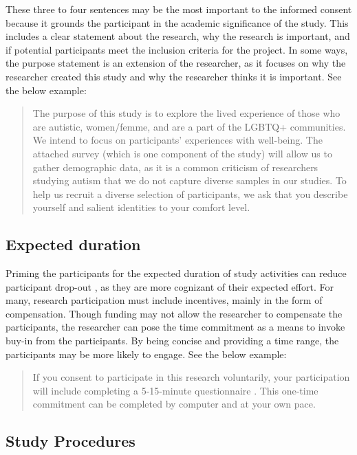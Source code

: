 \documentclass[
  11pt,
]{book}
\begin{document}
These three to four sentences may be the most important to the informed consent because it grounds the participant in the academic significance of the study. This includes a clear statement about the research, why the research is important, and if potential participants meet the inclusion criteria for the project. In some ways, the purpose statement is an extension of the researcher, as it focuses on why the researcher created this study and why the researcher thinks it is important. See the below example:

\begin{quote}
The purpose of this study is to explore the lived experience of those who are autistic, women/femme, and are a part of the LGBTQ+ communities. We intend to focus on participants' experiences with well-being. The attached survey (which is one component of the study) will allow us to gather demographic data, as it is a common criticism of researchers studying autism that we do not capture diverse samples in our studies. To help us recruit a diverse selection of participants, we ask that you describe yourself and salient identities to your comfort level.
\end{quote}

\subsection{Expected duration}\label{expected-duration}

Priming the participants for the expected duration of study activities can reduce participant drop-out \citep{oneil_web-based_2003}, as they are more cognizant of their expected effort. For many, research participation must include incentives, mainly in the form of compensation. Though funding may not allow the researcher to compensate the participants, the researcher can pose the time commitment as a means to invoke buy-in from the participants. By being concise and providing a time range, the participants may be more likely to engage. See the below example:

\begin{quote}
If you consent to participate in this research voluntarily, your participation will include completing a 5-15-minute questionnaire . This one-time commitment can be completed by computer and at your own pace.
\end{quote}

\subsection{Study Procedures}\label{study-procedures}
\end{document}
